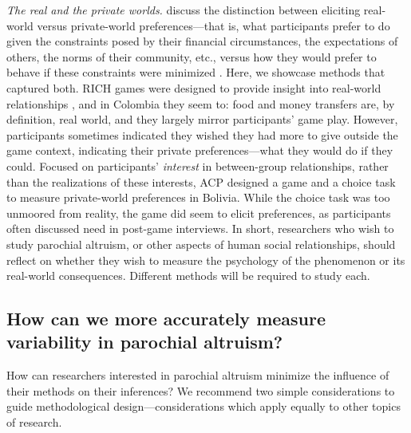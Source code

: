 \documentclass[bibauthoryear]{aa}
\begin{document}
\emph{The real and the private worlds.} \citet{Pisor2020} discuss the distinction between eliciting real-world versus private-world preferences---that is, what participants prefer to do given the constraints posed by their financial circumstances, the expectations of others, the norms of their community, etc., versus how they would prefer to behave if these constraints were minimized   \citep[see also][]{Naar2020}. Here, we showcase methods that captured both. RICH games were designed to provide insight into real-world relationships \citep{gervais2017rich, Pisor2020}, and in Colombia they seem to: food and money transfers are, by definition, real world, and they largely mirror participants' game play. However, participants sometimes indicated they wished they had more to give outside the game context, indicating their private preferences---what they would do if they could. Focused on participants' \emph{interest} in between-group relationships, rather than the realizations of these interests, ACP designed a game and a choice task to measure private-world preferences in Bolivia. While the choice task was too unmoored from reality, the game did seem to elicit preferences, as participants often discussed need in post-game interviews. In short, researchers who wish to study parochial altruism, or other aspects of human social relationships, should reflect on whether they wish to measure the psychology of the phenomenon or its real-world consequences. Different methods will be required to study each.

\subsection{How can we more accurately measure variability in parochial altruism?}

How can researchers interested in parochial altruism minimize the influence of their methods on their inferences? We recommend two simple considerations to guide methodological design---considerations which apply equally to other topics of research.
\end{document}
